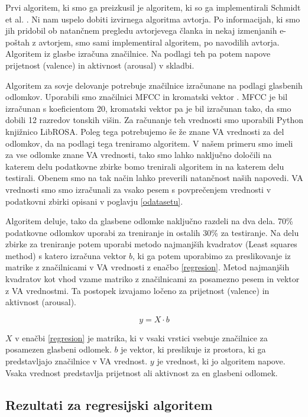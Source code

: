 \documentclass[a4paper, 12pt]{book}
\begin{document}
{Prvi algoritem, ki smo ga preizkusil je algoritem, ki so ga implementirali Schmidt et al. \cite{schmidt2009projection}. Ni nam uspelo dobiti izvirnega algoritma avtorja. Po informacijah, ki smo jih pridobil ob natančnem pregledu avtorjevega članka in nekaj izmenjanih e-poštah z avtorjem, smo sami implementiral algoritem, po navodilih avtorja. Algoritem iz glasbe izračuna značilnice. Na podlagi teh pa potem napove prijetnost (valence) in aktivnost (arousal) v skladbi. 

Algoritem za sovje delovanje potrebuje značilnice izračunane na podlagi glasbenih odlomkov. Uporabili smo značilnici MFCC \cite{logan2000mel} in kromatski vektor \cite{Bello2005}. MFCC je bil izračunan s koeficientom 20, kromatski vektor pa je bil izračunan tako, da smo dobili 12 razredov tonskih višin. Za računanje teh vrednosti smo uporabili Python knjižnico LibROSA. Poleg tega potrebujemo še že znane VA vrednosti za del odlomkov, da na podlagi tega treniramo algoritem. V našem primeru smo imeli za vse odlomke znane VA vrednosti, tako smo lahko naključno določili na katerem delu podatkovne zbirke bomo trenirali algoritem in na katerem delu testirali. Obenem smo na tak način lahko preverili natančnost naših napovedi. VA vrednosti smo smo izračunali za vsako pesem s povprečenjem vrednosti v podatkovni zbirki opisani v poglavju \ref{odatasetu}.

Algoritem deluje, tako da glasbene odlomke naključno razdeli na dva dela. 70\% podatkovne odlomkov uporabi za treniranje in ostalih 30\% za testiranje. Na delu zbirke za treniranje potem uporabi metodo najmanjših kvadratov (Least squares method) \cite{abdi2007method} s katero izračuna vektor $b$, ki ga potem uporabimo za preslikovanje iz matrike z značilnicami v VA vrednosti z enačbo \ref{regresion}. Metod najmanjših kvadratov kot vhod vzame matriko z značilnicami za posamezno pesem in vektor z VA vrednostmi. Ta postopek izvajamo ločeno za prijetnost (valence) in aktivnost (arousal).  

\begin{equation} 
\label{regresion}
y = X \cdot b
\end{equation} 

$X$ v enačbi \ref{regresion} je matrika, ki v vsaki vrstici vsebuje značilnice za posamezen glasbeni odlomek. $b$ je vektor, ki preslikuje iz prostora, ki ga predstavljajo značilnice v VA vrednost. $y$ je vrednost, ki jo algoritem napove. Vsaka vrednost predstavlja prijetnost ali aktivnost za en glasbeni odlomek. 

\subsection{Rezultati za regresijski algoritem}

}
\end{document}
